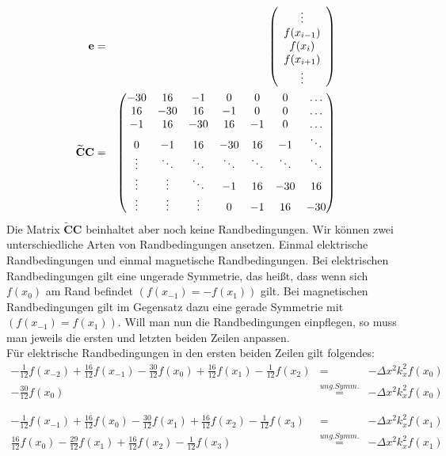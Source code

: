 \documentclass[Protokollheft.tex]{subfiles}
\begin{document}
	\begin{eqnarray*}
		\mathbf{e}&=&\left(\begin{array}{c} \vdots\\ f(x_{i-1})\\ f(x_i) \\ f(x_{i+1})\\
			\vdots\\\end{array}\right)\\
		\noindent
		\mathbf{\widetilde{C}C}&=&\begin{pmatrix} -30 & 16 & -1 & 0 & 0 & 0 & \dots \\ 
			16 & -30 & 16 & -1 & 0 & 0 & \dots\\ 
			-1 & 16 & -30 & 16 & -1 & 0 & \dots\\ 
			0 & -1 & 16 & -30 & 16 & -1 & \ddots\\ 
			\vdots & \ddots & \ddots & \ddots & \ddots & \ddots & \ddots\\
			\vdots & \vdots & \ddots & -1 & 16 & -30 & 16\\
			\vdots & \vdots & \vdots & 0 & -1 & 16 & -30\\
		\end{pmatrix}
	\end{eqnarray*}
	Die Matrix $\mathbf{\widetilde{C}C}$ beinhaltet aber noch keine Randbedingungen. Wir können zwei unterschiedliche Arten von Randbedingungen ansetzen. Einmal elektrische Randbedingungen und einmal magnetische Randbedingungen. Bei elektrischen Randbedingungen gilt eine ungerade Symmetrie, das heißt, dass wenn sich $f(x_0)$ am Rand befindet $(f(x_{-1})=-f(x_{1}))$ gilt. Bei magnetischen Randbedingungen gilt im Gegensatz dazu eine gerade Symmetrie mit $(f(x_{-1})=f(x_{1}))$. Will man nun die Randbedingungen einpflegen, so muss man jeweils die ersten und letzten beiden Zeilen anpassen.\\
	Für elektrische Randbedingungen in den ersten beiden Zeilen gilt folgendes:
	\begin{eqnarray*}
		-\frac{1}{12}f(x_{-2})+\frac{16}{12}f(x_{-1})-\frac{30}{12}f(x_0)+\frac{16}{12}f(x_{1})-\frac{1}{12}f(x_{2})&=&-\Delta x^2k^2_xf(x_0)\\
		-\frac{30}{12}f(x_0)&\stackrel{ung. Symm.}{=}&-\Delta x^2k^2_xf(x_0)\\
		\\
		\\
		-\frac{1}{12}f(x_{-1})+\frac{16}{12}f(x_{0})-\frac{30}{12}f(x_1)+\frac{16}{12}f(x_{2})-\frac{1}{12}f(x_{3})&=&-\Delta x^2k^2_xf(x_1)\\
		\frac{16}{12}f(x_{0})-\frac{29}{12}f(x_1)+\frac{16}{12}f(x_{2})-\frac{1}{12}f(x_{3})&\stackrel{ung. Symm.}{=}&-\Delta x^2k^2_xf(x_1)\\
	\end{eqnarray*}
\end{document}
